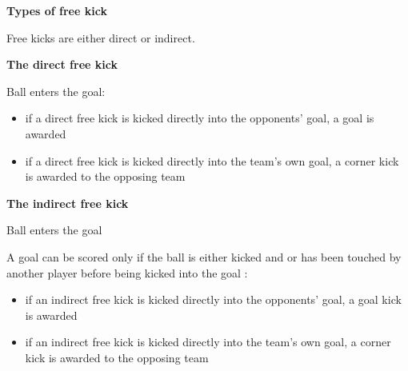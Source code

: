 \clearpage
\sffamily
{\bfseries\color[rgb]{0.4,0.4,0.4}{Law 13 -- Free Kicks} }
{}

\bigskip

{\bfseries Types of free kick}

\headlinebox

Free kicks are either direct or indirect.

\bigskip

{\bfseries The direct free kick }

\headlinebox

Ball enters the goal:

\begin{itemize}
\item if a direct free kick is kicked directly into the
opponents{\textquoteright} goal, a goal is awarded
\item if a direct free kick is kicked directly into the team's own goal, a corner kick is awarded to the opposing team
\end{itemize}

\bigskip

{\bfseries The indirect free kick}

\headlinebox



\bigskip

Ball enters the goal

A goal can be scored only if the ball is either kicked and   or has been touched by another player before being
kicked into the goal
:

\begin{itemize}
\item if an indirect free kick is kicked directly into the
opponents' goal, a goal kick is awarded
\item if an indirect free kick is kicked directly into the
team's own goal, a corner kick is awarded to the
opposing team
\end{itemize}

\bigskip


